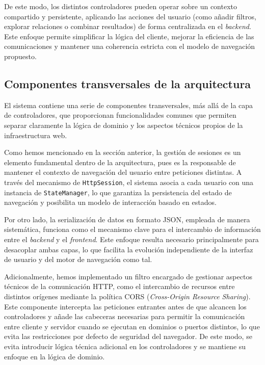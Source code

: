 De este modo, los distintos controladores pueden operar sobre un contexto compartido y persistente, aplicando las 
acciones del usuario (como añadir filtros, explorar relaciones o combinar resultados) de forma centralizada en 
el \textit{backend}. Este enfoque permite simplificar la lógica del cliente, mejorar la eficiencia de las comunicaciones 
y mantener una coherencia estricta con el modelo de navegación propuesto.

    \subsection*{Componentes transversales de la arquitectura}

El sistema contiene una serie de componentes transversales, más allá de la capa de controladores, que proporcionan
funcionalidades comunes que permiten separar claramente la lógica de dominio y los aspectos técnicos propios de la
infraestructura web.

Como hemos mencionado en la sección anterior, la gestión de sesiones es un elemento fundamental dentro de la arquitectura, pues
es la responsable de mantener el contexto de navegación del usuario entre peticiones distintas. A través del mecanismo de
\texttt{HttpSession}, el sistema asocia a cada usuario con una instancia de \texttt{StateManager}, lo que
garantiza la persistencia del estado de navegación y posibilita un modelo de interacción basado en estados.

Por otro lado, la serialización de datos en formato JSON, empleada de manera sistemática, funciona como el mecanismo
clave para el intercambio de información entre el \textit{backend} y el \textit{frontend}. Este enfoque resulta necesario principalmente
para desacoplar ambas capas, lo que facilita la evolución independiente de la interfaz de usuario y del motor de navegación
como tal.

Adicionalmente, hemos implementado un filtro encargado de gestionar aspectos técnicos de la comunicación HTTP,
como el intercambio de recursos entre distintos orígenes mediante la política CORS (\textit{Cross-Origin Resource Sharing}).
Este componente intercepta las peticiones entrantes antes de que alcancen los controladores y añade
las cabeceras necesarias para permitir la comunicación entre cliente y servidor cuando se ejecutan en
dominios o puertos distintos, lo que evita las restricciones por defecto de seguridad del navegador. De este modo,
se evita introducir lógica técnica adicional en los controladores y se mantiene su enfoque en la lógica de dominio.

